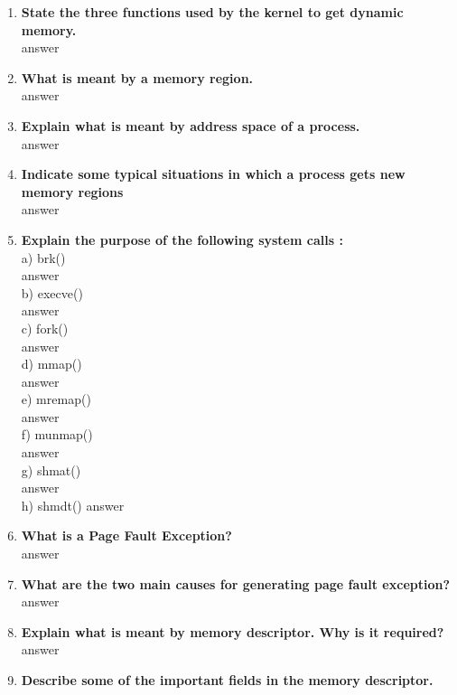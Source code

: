 \documentclass[a4paper,12pt]{article}
\begin{document}
\begin{flushleft}
\begin{enumerate}
\item \textbf{ State the three functions used by the kernel to get dynamic memory.}\\
{\color{red}answer}\\
\item \textbf{ What is meant by a memory region.}\\
{\color{red}answer}\\
\item \textbf{ Explain what is meant by address space of a process.}\\
{\color{red}answer}\\
\item \textbf{ Indicate some typical situations in which a process gets new memory regions}\\
{\color{red}answer}\\
\item \textbf{ Explain the purpose of the following system calls :}\\
a) brk()\\
{\color{red}answer}\\
 b) execve()\\
 {\color{red}answer}\\
  c) fork()\\
  {\color{red}answer}\\
   d) mmap()\\
{\color{red}answer}\\
e) mremap()\\
{\color{red}answer}\\
 f) munmap()\\
 {\color{red}answer}\\ 
 g) shmat() \\
 {\color{red}answer}\\
 h) shmdt()
{\color{red}answer}\\
\item \textbf{ What is a Page Fault Exception?}\\
{\color{red}answer}\\
\item \textbf{ What are the two main causes for generating page fault exception?}\\
{\color{red}answer}\\
\item \textbf{ Explain what is meant by memory descriptor. Why is it required?}\\
{\color{red}answer}\\
\item \textbf{ Describe some of the important fields in the memory descriptor.}\\

\end{enumerate}
\end{flushleft}
\end{document}
